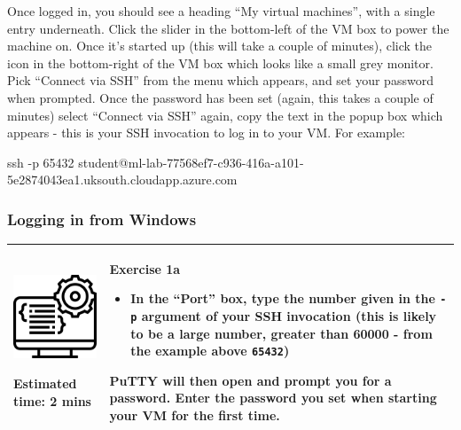 \documentclass[
  english,
  paper=a4,
  ,captions=tableheading
]{scrartcl}
\newenvironment{Shaded}{\begin{snugshade}}{\end{snugshade}}
\newcommand{\FunctionTok}[1]{\textcolor[rgb]{0.00,0.00,0.00}{#1}}
\newcommand{\NormalTok}[1]{#1}
\providecommand{\tightlist}{%
  \setlength{\itemsep}{0pt}\setlength{\parskip}{0pt}}
\begin{document}
Once logged in, you should see a heading \enquote{My virtual machines},
with a single entry underneath. Click the slider in the bottom-left of
the VM box to power the machine on. Once it's started up (this will take
a couple of minutes), click the icon in the bottom-right of the VM box
which looks like a small grey monitor. Pick \enquote{Connect via SSH}
from the menu which appears, and set your password when prompted. Once
the password has been set (again, this takes a couple of minutes) select
\enquote{Connect via SSH} again, copy the text in the popup box which
appears - this is your SSH invocation to log in to your VM. For example:

\begin{Shaded}
\begin{Highlighting}[]
\FunctionTok{ssh}\NormalTok{ -p 65432 student@ml-lab-77568ef7-c936-416a-a101-5e2874043ea1.uksouth.cloudapp.azure.com}
\end{Highlighting}
\end{Shaded}

\hypertarget{logging-in-from-windows}{%
\subsubsection{Logging in from Windows}\label{logging-in-from-windows}}

\begin{longtable}[]{@{}ll@{}}
\toprule
\endhead
\begin{minipage}[t]{0.36\columnwidth}\raggedright
\includegraphics[width=1.5625in,height=\textheight]{media/programming.png}

Estimated time: 2 mins\strut
\end{minipage} & \begin{minipage}[t]{0.58\columnwidth}\raggedright
\textbf{Exercise 1a}

\begin{itemize}
\tightlist
\item
  In the \enquote{Port} box, type the number given in the \texttt{-p}
  argument of your SSH invocation (this is likely to be a large number,
  greater than 60000 - from the example above \texttt{65432})
\end{itemize}

PuTTY will then open and prompt you for a password. Enter the password
you set when starting your VM for the first time.\strut
\end{minipage}\tabularnewline
\bottomrule
\end{longtable}
\end{document}
